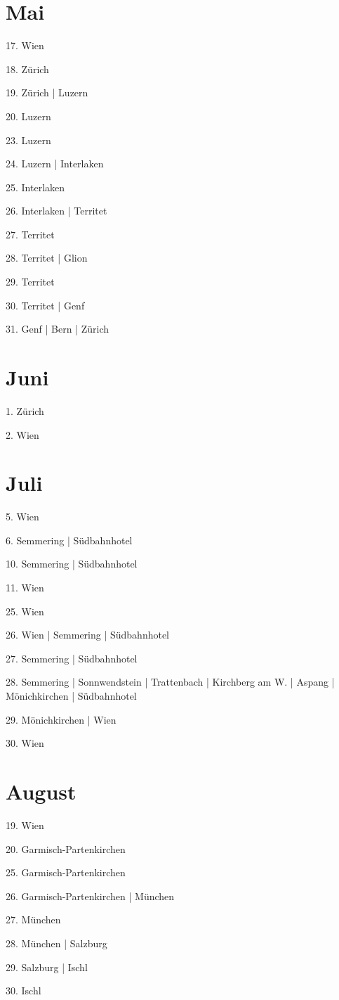 \documentclass[twoside=false,titlepage=false,open=any, parskip=never, fontsize=10pt, headings=small, chapterprefix=false, appendixprefix=false, DIV=15]{scrbook}
\begin{document}
\begin{multicols}{3}
            \section*{Mai}
            17. Wien\par
            18. Zürich\par
            19. Zürich | Luzern\par
            20. Luzern\par
            23. Luzern\par
            24. Luzern | Interlaken\par
            25. Interlaken\par
            26. Interlaken | Territet\par
            27. Territet\par
            28. Territet | Glion\par
            29. Territet\par
            30. Territet | Genf\par
            31. Genf | Bern | Zürich\par
            \section*{Juni}
            1. Zürich\par
            2. Wien\par
            \section*{Juli}
            5. Wien\par
            6. Semmering | Südbahnhotel\par
            10. Semmering | Südbahnhotel\par
            11. Wien\par
            25. Wien\par
            26. Wien | Semmering | Südbahnhotel\par
            27. Semmering | Südbahnhotel\par
            28. Semmering | Sonnwendstein | Trattenbach | Kirchberg am W. | Aspang | Mönichkirchen | Südbahnhotel\par
            29. Mönichkirchen | Wien\par
            30. Wien\par
            \section*{August}
            19. Wien\par
            20. Garmisch-Partenkirchen\par
            25. Garmisch-Partenkirchen\par
            26. Garmisch-Partenkirchen | München\par
            27. München\par
            28. München | Salzburg\par
            29. Salzburg | Ischl\par
            30. Ischl\par

\end{multicols}
\end{document}
